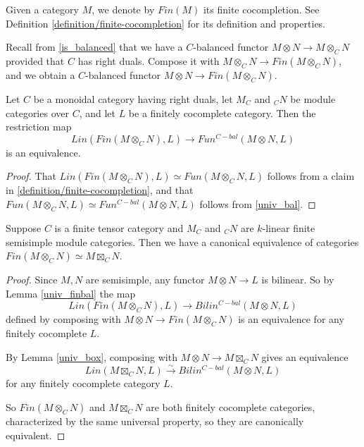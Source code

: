 \begin{notation}
  Given a category $M$, we denote by $Fin(M)$ its finite cocompletion. See
  Definition \ref{definition/finite-cocompletion} for its definition and
  properties.
\end{notation}

Recall from \ref{is_balanced} that we have a $C$-balanced functor $M\otimes
N \to M\otimes_C N$ provided that $C$ has right duals. Compose it with
$M\otimes_C N \to Fin(M\otimes_C N)$, and we obtain a $C$-balanced functor
$M\otimes N\to Fin(M\otimes_C N)$.

\begin{lemma}\label{univ_finbal}

  \noindent Let $C$ be a monoidal category having right duals, let $M_C$ and $_{C}N$ be
  module categories over $C$, and let $L$ be a finitely cocomplete category.
  Then the restriction map $$Lin(Fin(M\otimes_C N),L)\to Fun^{C-bal}(M\otimes
  N,L)$$ is an equivalence.
\end{lemma}

\begin{proof}
  That $Lin(Fin(M\otimes_C N),L) \simeq Fun(M \otimes_{C} N, L)$ follows from
  a claim in \ref{definition/finite-cocompletion}, and that $Fun(M \otimes_{C}
  N, L) \simeq Fun^{C-bal}(M \otimes N, L)$ follows from \ref{univ_bal}.
\end{proof}

\begin{proposition}\label{fin_eq_bal}

  Suppose $C$ is a finite tensor category and $M_C$ and $_{C}N$ are $k$-linear
  finite semisimple module categories. Then we have a canonical equivalence of
  categories $Fin(M\otimes_C N) \simeq M\boxtimes_C N$.
    
\end{proposition}

\begin{proof}

  Since $M,N$ are semisimple, any functor $M\otimes N\to L$ is bilinear. So by
  Lemma \ref{univ_finbal} the map \[Lin(Fin(M \otimes_{C} N), L) \to
  Bilin^{C-bal}(M \otimes N, L)\] defined by composing with $M\otimes N\to
  Fin(M\otimes_C N)$ is an equivalence for any finitely cocomplete $L$.

  By Lemma \ref{univ_box}, composing with $M\otimes N\to M\boxtimes_C N$ gives
  an equivalence \[Lin(M \boxtimes_{C} N, L) \xrightarrow{\sim}
  Bilin^{C-bal}(M \otimes N, L)\] for any finitely cocomplete category $L$.

  So $Fin(M\otimes_C N)$ and $M \boxtimes_{C} N$ are both finitely cocomplete
  categories, characterized by the same universal property, so they are
  canonically equivalent.
\end{proof}

